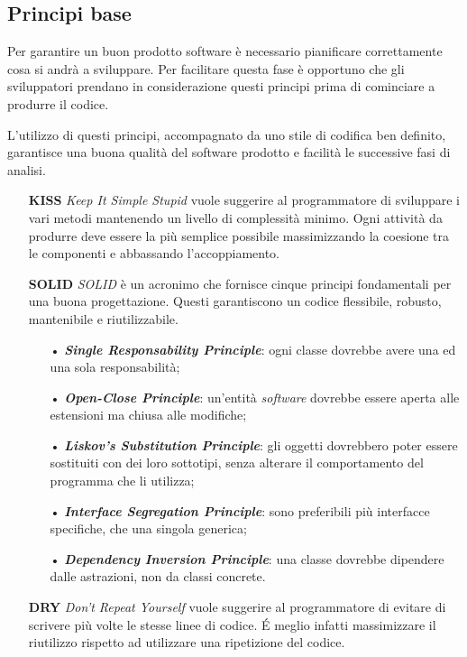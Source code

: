 \subsection{Principi base}
Per garantire un buon prodotto software è necessario pianificare correttamente cosa si andrà a sviluppare. Per facilitare questa fase è opportuno che gli sviluppatori prendano in considerazione questi principi prima di cominciare a produrre il codice. 

L'utilizzo di questi principi, accompagnato da uno stile di codifica ben definito, garantisce una buona qualità del software prodotto e facilità le successive fasi di analisi.

\begin{itemize}
\item[] \textbf{KISS} \textit{Keep It Simple Stupid} vuole suggerire al programmatore di sviluppare i vari metodi mantenendo un livello di complessità minimo. Ogni attività da produrre deve essere la più semplice possibile massimizzando la coesione tra le componenti e abbassando l'accoppiamento.

\item[] \textbf{SOLID} \textit{SOLID} è un acronimo che fornisce cinque principi fondamentali per una buona progettazione. Questi garantiscono un codice flessibile, robusto, mantenibile e riutilizzabile.
\begin{itemize}
\item[•] \textbf{\textit{Single Responsability Principle}}: ogni classe dovrebbe avere una ed una sola responsabilità;

\item[•] \textbf{\textit{Open-Close Principle}}: un'entità \textit{software} dovrebbe essere aperta alle estensioni ma chiusa alle modifiche;

\item[•] \textbf{\textit{Liskov's Substitution Principle}}: gli oggetti dovrebbero poter essere sostituiti con dei loro sottotipi, senza alterare il comportamento del programma che li utilizza;

\item[•] \textbf{\textit{Interface Segregation Principle}}: sono preferibili più interfacce specifiche, che una singola generica;

\item[•] \textbf{\textit{Dependency Inversion Principle}}: una classe dovrebbe dipendere dalle astrazioni, non da classi concrete.
\end{itemize}

\item[] \textbf{DRY} \textit{Don't Repeat Yourself} vuole suggerire al programmatore di evitare di scrivere più volte le stesse linee di codice. É meglio infatti massimizzare il riutilizzo rispetto ad utilizzare una ripetizione del codice.
\end{itemize}

